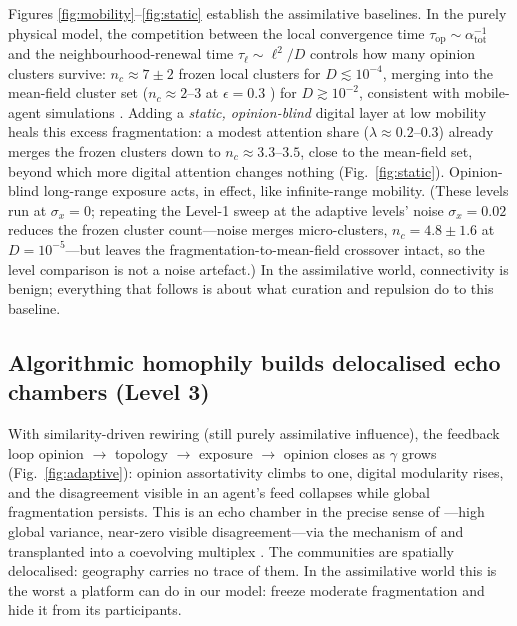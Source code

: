 \documentclass[5p,times,twocolumn]{elsarticle}
\begin{document}
Figures \ref{fig:mobility}--\ref{fig:static} establish the assimilative
baselines. In the purely physical model, the competition between the local
convergence time $\tau_{\mathrm{op}} \sim \alpha_{\mathrm{tot}}^{-1}$ and
the neighbourhood-renewal time $\tau_\ell \sim \ell^2/D$ controls how many
opinion clusters survive: $n_c \approx 7 \pm 2$ frozen local clusters for
$D \lesssim 10^{-4}$, merging into the mean-field cluster set
($n_c \approx 2$--$3$ at $\epsilon = 0.3$ \citep{deffuant2000}) for
$D \gtrsim 10^{-2}$, consistent with mobile-agent simulations
\citep{alraddadi2024}. Adding a \emph{static, opinion-blind}
digital layer at low mobility heals this excess fragmentation: a modest
attention share ($\lambda \approx 0.2$--$0.3$) already merges the frozen
clusters down to $n_c \approx 3.3$--$3.5$, close to the mean-field set,
beyond which more digital
attention changes nothing (Fig.~\ref{fig:static}). Opinion-blind
long-range exposure acts, in effect, like infinite-range mobility. (These
levels run at $\sigma_x = 0$; repeating the Level-1 sweep at the adaptive
levels' noise $\sigma_x = 0.02$ reduces the frozen cluster count---noise
merges micro-clusters, $n_c = 4.8 \pm 1.6$ at $D = 10^{-5}$---but leaves
the fragmentation-to-mean-field crossover intact, so the level comparison
is not a noise artefact.) In the
assimilative world, connectivity is benign; everything that follows is
about what curation and repulsion do to this baseline.

\subsection{Algorithmic homophily builds delocalised echo chambers
(Level 3)}
\label{sec:level3}

With similarity-driven rewiring (still purely assimilative influence), the
feedback loop opinion $\to$ topology $\to$ exposure $\to$ opinion closes as
$\gamma$ grows (Fig.~\ref{fig:adaptive}): opinion assortativity climbs to
one, digital modularity rises, and the disagreement visible in an agent's
feed collapses while global fragmentation persists. This is an echo
chamber in the precise sense of \citet{baumann2020}---high global
variance, near-zero visible disagreement---via the mechanism of
\citet{sirbu2019} and \citet{santos2021} transplanted into a coevolving
multiplex \citep{holme2006}. The communities are spatially delocalised:
geography carries no trace of them. In the assimilative world this is the
worst a platform can do in our model: freeze moderate fragmentation and
hide it from its participants.
\end{document}
